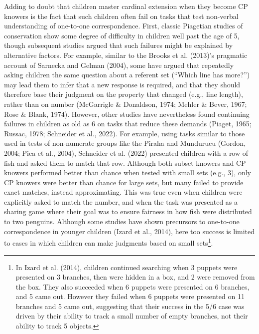 \documentclass[
  man,floatsintext]{apa7}
\begin{document}
Adding to doubt that children master cardinal extension when they become CP knowers is the fact that such children often fail on tasks that test non-verbal understanding of one-to-one correspondence. First, classic Piagetian studies of conservation show some degree of difficulty in children well past the age of 5, though subsequent studies argued that such failures might be explained by alternative factors. For example, similar to the Brooks et al. (2013)'s pragmatic account of Sarnecka and Gelman (2004), some have argued that repeatedly asking children the same question about a referent set (``Which line has more?'') may lead them to infer that a new response is required, and that they should therefore base their judgment on the property that changed (e.g., line length), rather than on number (McGarrigle \& Donaldson, 1974; Mehler \& Bever, 1967; Rose \& Blank, 1974). However, other studies have nevertheless found continuing failures in children as old as 6 on tasks that reduce these demands (Piaget, 1965; Russac, 1978; Schneider et al., 2022). For example, using tasks similar to those used in tests of non-numerate groups like the Piraha and Mundurucu (Gordon, 2004; Pica et al., 2004), Schneider et al. (2022) presented children with a row of fish and asked them to match that row. Although both subset knowers and CP knowers performed better than chance when tested with small sets (e.g., 3), only CP knowers were better than chance for large sets, but many failed to provide exact matches, instead approximating. This was true even when children were explicitly asked to match the number, and when the task was presented as a sharing game where their goal was to ensure fairness in how fish were distributed to two penguins. Although some studies have shown precursors to one-to-one correspondence in younger children (Izard et al., 2014), here too success is limited to cases in which children can make judgments based on small sets\footnote{In Izard et al. (2014), children continued searching when 3 puppets were presented on 3 branches, then were hidden in a box, and 2 were removed from the box. They also succeeded when 6 puppets were presented on 6 branches, and 5 came out. However they failed when 6 puppets were presented on 11 branches and 5 came out, suggesting that their success in the 5/6 case was driven by their ability to track a small number of empty branches, not their ability to track 5 objects.}.
\end{document}
